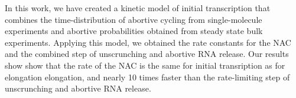 In this work, we have created a kinetic model of initial transcription that
combines the time-distribution of abortive cycling from single-molecule
experiments and abortive probabilities obtained from steady state bulk
experiments. Applying this model, we obtained the rate constants for the NAC
and the combined step of unscrunching and abortive RNA release. Our results
show show that the rate of the NAC is the same for initial transription as for
elongation elongation, and nearly 10 times faster than the rate-limiting step
of unscrunching and abortive RNA release.





